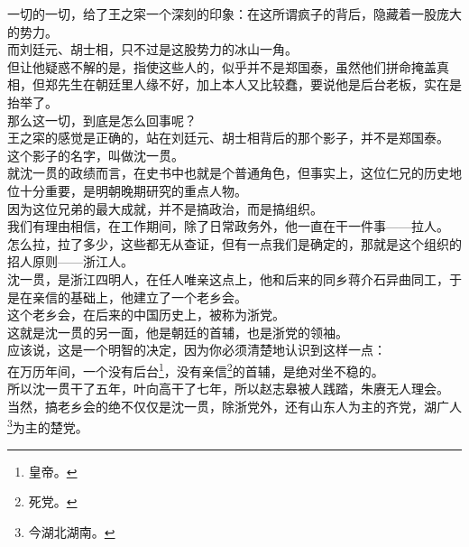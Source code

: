 \begin{multicols}{\theparacolNo}
一切的一切，给了王之寀一个深刻的印象：在这所谓疯子的背后，隐藏着一股庞大的势力。\\

而刘廷元、胡士相，只不过是这股势力的冰山一角。\\

但让他疑惑不解的是，指使这些人的，似乎并不是郑国泰，虽然他们拼命掩盖真相，但郑先生在朝廷里人缘不好，加上本人又比较蠢，要说他是后台老板，实在是抬举了。\\

那么这一切，到底是怎么回事呢？\\

王之寀的感觉是正确的，站在刘廷元、胡士相背后的那个影子，并不是郑国泰。\\

这个影子的名字，叫做沈一贯。\\

就沈一贯的政绩而言，在史书中也就是个普通角色，但事实上，这位仁兄的历史地位十分重要，是明朝晚期研究的重点人物。\\

因为这位兄弟的最大成就，并不是搞政治，而是搞组织。\\

我们有理由相信，在工作期间，除了日常政务外，他一直在干一件事——拉人。\\

怎么拉，拉了多少，这些都无从查证，但有一点我们是确定的，那就是这个组织的招人原则——浙江人。\\

沈一贯，是浙江四明人，在任人唯亲这点上，他和后来的同乡蒋介石异曲同工，于是在亲信的基础上，他建立了一个老乡会。\\

这个老乡会，在后来的中国历史上，被称为浙党。\\

这就是沈一贯的另一面，他是朝廷的首辅，也是浙党的领袖。\\

应该说，这是一个明智的决定，因为你必须清楚地认识到这样一点：\\

在万历年间，一个没有后台\footnote{皇帝。}，没有亲信\footnote{死党。}的首辅，是绝对坐不稳的。\\

所以沈一贯干了五年，叶向高干了七年，所以赵志皋被人践踏，朱赓无人理会。\\

当然，搞老乡会的绝不仅仅是沈一贯，除浙党外，还有山东人为主的齐党，湖广人\footnote{今湖北湖南。}为主的楚党。\\


\end{multicols}
